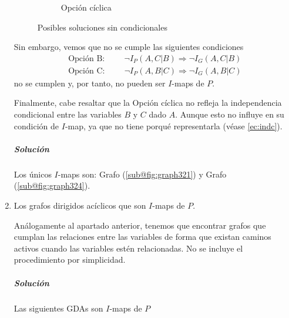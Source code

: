 \documentclass[12pt,a4paper]{article}
\begin{document}
\begin{enumerate}
\begin{figure}[h!]
\begin{subfigure}{0.3\textwidth}
            \caption{Opción cíclica}
            \label{fig:graph324}
        \end{subfigure}
        \caption{Posibles soluciones sin condicionales}
    \end{figure}
    Sin embargo, vemos que no se cumple las siguientes condiciones 
    \begin{align*}
        \text{Opción B:} \hspace{1cm} \neg I_P(A, C | B) \Longrightarrow \neg I_G(A, C | B) \\
        \text{Opción C:} \hspace{1cm} \neg I_P(A, B | C) \Longrightarrow \neg I_G(A, B | C)
    \end{align*}
    no se cumplen y, por tanto, no pueden ser $I$-maps de $P$. 

    Finalmente, cabe resaltar que la Opción cíclica no refleja la independencia condicional entre las variables $B$ y $C$ dado $A$. Aunque esto no influye en su condición de $I$-map, ya que no tiene porqué representarla (véase \eqref{ec:indc}).
    \subparagraph*{Solución} 
    Los únicos $I$-maps son: Grafo (\ref{sub@fig:graph321}) y Grafo (\ref{sub@fig:graph324}).

    \item Los grafos dirigidos acíclicos que son $I$-maps de $P$.
    
    Análogamente al apartado anterior, tenemos que encontrar grafos que cumplan las relaciones entre las variables de forma que existan caminos activos cuando las variables estén relacionadas. No se incluye el procedimiento por simplicidad.

    \subparagraph*{Solución}
    Las siguientes GDAs son $I$-maps de $P$


\end{enumerate}
\end{document}
